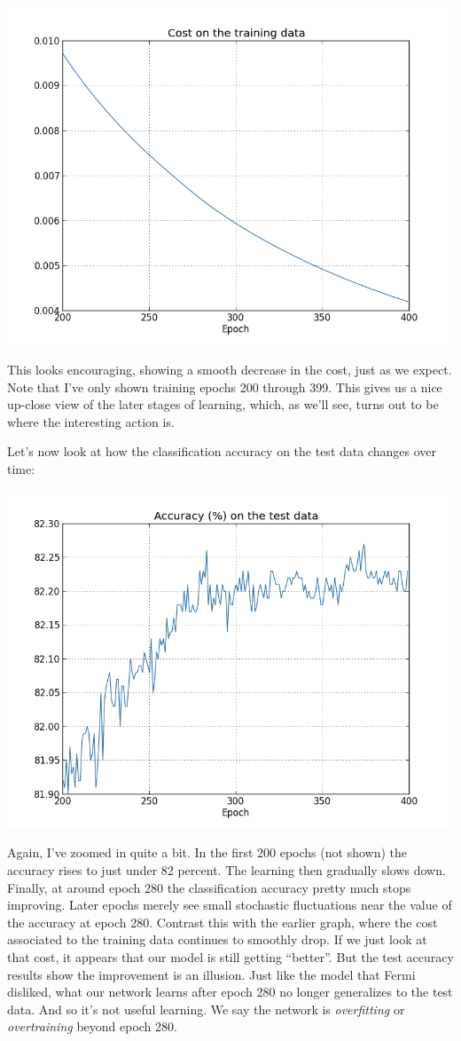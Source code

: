 \documentclass[a4paper,twoside,10pt]{book}
\begin{document}
\begin{center}
	\includegraphics[width=0.7\linewidth]{figures/ch3/overfitting1}
\end{center}
This looks encouraging, showing a smooth decrease in the cost, just as we expect. Note that I've only shown training epochs 200 through 399. This gives us a nice up-close view of the later stages of learning, which, as we'll see, turns out to be where the interesting action is.

Let's now look at how the classification accuracy on the test data changes over time:
\begin{center}
	\includegraphics[width=0.7\linewidth]{figures/ch3/overfitting2}
\end{center}
Again, I've zoomed in quite a bit. In the first 200 epochs (not shown) the accuracy rises to just under 82 percent. The learning then gradually slows down. Finally, at around epoch 280 the classification accuracy pretty much stops improving. Later epochs merely see small stochastic fluctuations near the value of the accuracy at epoch 280. Contrast this with the earlier graph, where the cost associated to the training data continues to smoothly drop. If we just look at that cost, it appears that our model is still getting ``better''. But the test accuracy results show the improvement is an illusion. Just like the model that Fermi disliked, what our network learns after epoch 280 no longer generalizes to the test data. And so it's not useful learning. We say the network is \textit{overfitting} or \textit{overtraining} beyond epoch 280.
\end{document}
